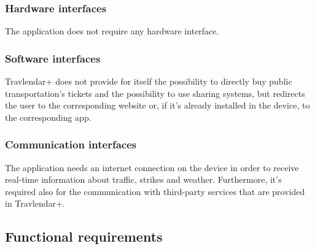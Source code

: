 \documentclass[12pt,titlepage]{article}
\begin{document}
\subsubsection{Hardware interfaces}\label{sec:mod1}
The application does not require any hardware interface. 

\subsubsection{Software interfaces}\label{sec:mod1}
Travlendar+ does not provide for itself the possibility to directly buy public transportation's tickets and the possibility to use sharing systems, but redirects the user to the corresponding website or, if it's already installed in the device, to the corresponding app.

\subsubsection{Communication interfaces}\label{sec:mod1}
The application needs an internet connection on the device in order to receive real-time information about traffic, strikes and weather. Furthermore, it's required also for the communication with third-party services that are provided in Travlendar+. 





\subsection{Functional requirements}\label{sec:mod1}
\end{document}
